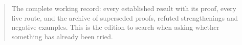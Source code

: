 \maketitle
\begin{abstract}
The complete working record: every established result with its proof, every
live route, and the archive of superseded proofs, refuted strengthenings and
negative examples.  This is the edition to search when asking whether something
has already been tried.
\end{abstract}
